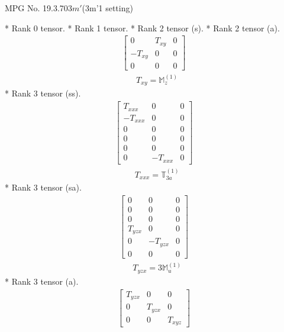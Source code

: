 \documentclass[fleqn,8pt,landscape]{jsarticle}
\begin{document}
\setcounter{MaxMatrixCols}{32}

\renewcommand{\tablename}{Table~}
\renewcommand{\figurename}{Figure~}
\begin{center}
\LARGE
MPG No. 19.3.70\quad$3m'$\quad(3m'1 setting)
\end{center}
* Rank 0 tensor.
* Rank 1 tensor.
* Rank 2 tensor (s).
* Rank 2 tensor (a).
\begin{align*}
\begin{bmatrix} 0 & T_{xy} & 0 \\ - T_{xy} & 0 & 0 \\ 0 & 0 & 0 \end{bmatrix}
\end{align*}
\begin{align*}
& T_{xy} = \mathbb{M}_{z}^{(1)}
\end{align*}
* Rank 3 tensor (ss).
\begin{align*}
\begin{bmatrix} T_{xxx} & 0 & 0 \\ - T_{xxx} & 0 & 0 \\ 0 & 0 & 0 \\ 0 & 0 & 0 \\ 0 & 0 & 0 \\ 0 & - T_{xxx} & 0 \end{bmatrix}
\end{align*}
\begin{align*}
& T_{xxx} = \mathbb{T}_{3a}^{(1)}
\end{align*}
* Rank 3 tensor (sa).
\begin{align*}
\begin{bmatrix} 0 & 0 & 0 \\ 0 & 0 & 0 \\ 0 & 0 & 0 \\ T_{yzx} & 0 & 0 \\ 0 & - T_{yzx} & 0 \\ 0 & 0 & 0 \end{bmatrix}
\end{align*}
\begin{align*}
& T_{yzx} = 3 \mathbb{M}_{u}^{(1)}
\end{align*}
* Rank 3 tensor (a).
\begin{align*}
\begin{bmatrix} T_{yzx} & 0 & 0 \\ 0 & T_{yzx} & 0 \\ 0 & 0 & T_{xyz} \end{bmatrix}
\end{align*}
\end{document}
